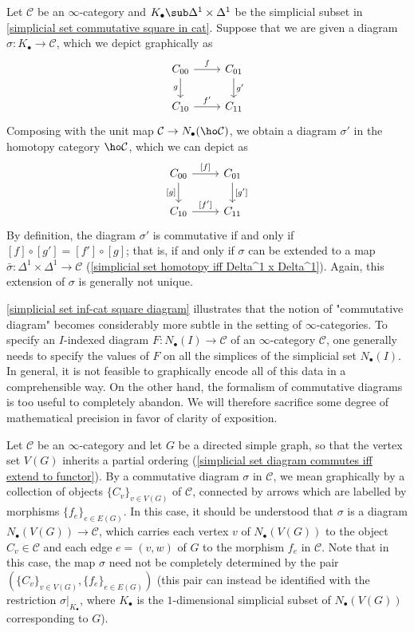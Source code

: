 \begin{example}
Let $\mathcal{C}$ be an $\infty$-category and $K_\bullet\sub\Delta^1\times\Delta^1$ be the simplicial subset in \cref{simplicial set commutative square in cat}. Suppose that we are given a diagram $\sigma:K_\bullet\to\mathcal{C}$, which we depict graphically as
\[\begin{tikzcd}
C_{00}\ar[r,"f"]\ar[d,swap,"g"]&C_{01}\ar[d,"g'"]\\
C_{10}\ar[r,"f'"]&C_{11}
\end{tikzcd}\]
Composing with the unit map $\mathcal{C}\to N_\bullet(\ho\mathcal{C})$, we obtain a diagram $\sigma'$ in the homotopy category $\ho\mathcal{C}$, which we can depict as
\[\begin{tikzcd}
C_{00}\ar[r,"{[f]}"]\ar[d,swap,"{[g]}"]&C_{01}\ar[d,"{[g']}"]\\
C_{10}\ar[r,"{[f']}"]&C_{11}
\end{tikzcd}\]
By definition, the diagram $\sigma'$ is commutative if and only if $[f]\circ[g']=[f']\circ[g]$; that is, if and only if $\sigma$ can be extended to a map $\bar{\sigma}:\Delta^1\times\Delta^1\to\mathcal{C}$ (\cref{simplicial set homotopy iff Delta^1 x Delta^1}). Again, this extension of $\sigma$ is generally not unique.
\end{example}
\cref{simplicial set inf-cat square diagram} illustrates that the notion of "commutative diagram" becomes considerably more subtle in the setting of $\infty$-categories. To specify an $I$-indexed diagram $F:N_\bullet(I)\to\mathcal{C}$ of an $\infty$-category $\mathcal{C}$, one generally needs to specify the values of $F$ on all the simplices of the simplicial set $N_\bullet(I)$. In general, it is not feasible to graphically encode all of this data in a comprehensible way. On the other hand, the formalism of commutative diagrams is too useful to completely abandon. We will therefore sacrifice some degree of mathematical precision in favor of clarity of exposition.\par
Let $\mathcal{C}$ be an $\infty$-category and let $G$ be a directed simple graph, so that the vertex set $V(G)$ inherits a partial ordering (\cref{simplicial set diagram commutes iff extend to functor}). By a commutative diagram $\sigma$ in $\mathcal{C}$, we mean graphically by a collection of objects $\{C_v\}_{v\in V(G)}$ of $\mathcal{C}$, connected by arrows which are labelled by morphisms $\{f_e\}_{e\in E(G)}$. In this case, it should be understood that $\sigma$ is a diagram $N_\bullet(V(G))\to\mathcal{C}$, which carries each vertex $v$ of $N_\bullet(V(G))$ to the object $C_v\in\mathcal{C}$ and each edge $e=(v,w)$ of $G$ to the morphism $f_e$ in $\mathcal{C}$. Note that in this case, the map $\sigma$ need not be completely determined by the pair $(\{C_v\}_{v\in V(G)},\{f_e\}_{e\in E(G)})$ (this pair can instead be identified with the restriction $\sigma|_{K_\bullet}$, where $K_\bullet$ is the $1$-dimensional simplicial subset of $N_\bullet(V(G))$ corresponding to $G$).
